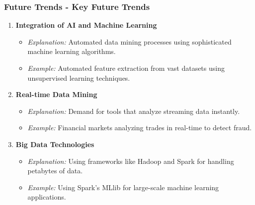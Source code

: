 \documentclass{beamer}
\begin{document}
\begin{frame}[fragile]
    \frametitle{Future Trends - Key Future Trends}
    \begin{enumerate}
        \item \textbf{Integration of AI and Machine Learning}
        \begin{itemize}
            \item \textit{Explanation:} Automated data mining processes using sophisticated machine learning algorithms.
            \item \textit{Example:} Automated feature extraction from vast datasets using unsupervised learning techniques.
        \end{itemize}
        
        \item \textbf{Real-time Data Mining}
        \begin{itemize}
            \item \textit{Explanation:} Demand for tools that analyze streaming data instantly.
            \item \textit{Example:} Financial markets analyzing trades in real-time to detect fraud.
        \end{itemize}
        
        \item \textbf{Big Data Technologies}
        \begin{itemize}
            \item \textit{Explanation:} Using frameworks like Hadoop and Spark for handling petabytes of data.
            \item \textit{Example:} Using Spark's MLlib for large-scale machine learning applications.
        \end{itemize}
    \end{enumerate}
\end{frame}
\end{document}
